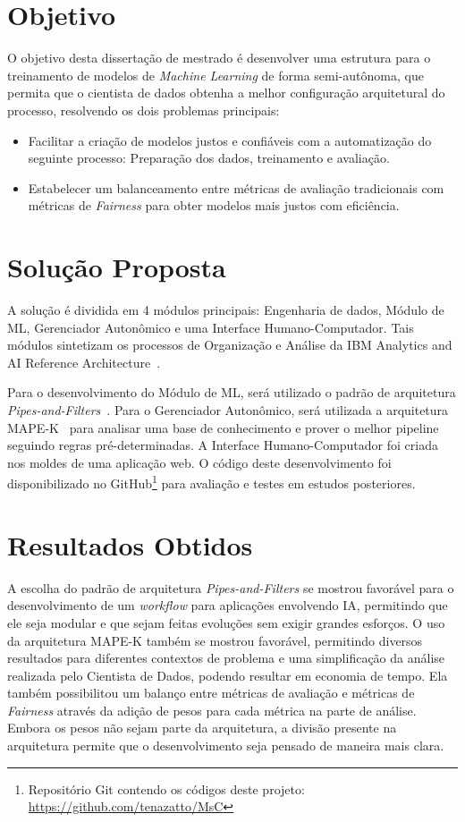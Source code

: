 \documentclass[Portugues,Final]{ic-tese-v3}
\begin{document}
\section{Objetivo}

O objetivo desta dissertação de mestrado é desenvolver uma estrutura para o treinamento de modelos de \textit{Machine Learning} de forma semi-autônoma, que permita que o cientista de dados obtenha a melhor configuração arquitetural do processo, resolvendo os dois problemas principais:

\begin{itemize}
\item Facilitar a criação de modelos justos e confiáveis com a automatização do seguinte processo: Preparação dos dados, treinamento e avaliação.
\item Estabelecer um balanceamento entre métricas de avaliação tradicionais com métricas de \textit{Fairness} para obter modelos mais justos com eficiência.
\end{itemize}

\section{Solução Proposta}

A solução é dividida em 4 módulos principais: Engenharia de dados, Módulo de ML, Gerenciador Autonômico e uma Interface Humano-Computador. Tais módulos sintetizam os processos de Organização e Análise da IBM Analytics and AI Reference Architecture~\cite{IBM_2021}.

Para o desenvolvimento do Módulo de ML, será utilizado o padrão de arquitetura \textit{Pipes-and-Filters}~\cite{Garlan_1993}. Para o Gerenciador Autonômico, será utilizada a arquitetura MAPE-K~\cite{IBM_2005} para analisar uma base de conhecimento e prover o melhor pipeline seguindo regras pré-determinadas. A Interface Humano-Computador foi criada nos moldes de uma aplicação web. O código deste desenvolvimento foi disponibilizado no GitHub\footnote{Repositório Git contendo os códigos deste projeto: \url{https://github.com/tenazatto/MsC}} para avaliação e testes em estudos posteriores.

\section{Resultados Obtidos}

A escolha do padrão de arquitetura \textit{Pipes-and-Filters} se mostrou favorável para o desenvolvimento de um \textit{workflow} para aplicações envolvendo IA, permitindo que ele seja modular e que sejam feitas evoluções sem exigir grandes esforços. O uso da arquitetura MAPE-K também se mostrou favorável, permitindo diversos resultados para diferentes contextos de problema e uma simplificação da análise realizada pelo Cientista de Dados, podendo resultar em economia de tempo. Ela também possibilitou um balanço entre métricas de avaliação e métricas de \textit{Fairness} através da adição de pesos para cada métrica na parte de análise. Embora os pesos não sejam parte da arquitetura, a divisão presente na arquitetura permite que o desenvolvimento seja pensado de maneira mais clara.
\end{document}
